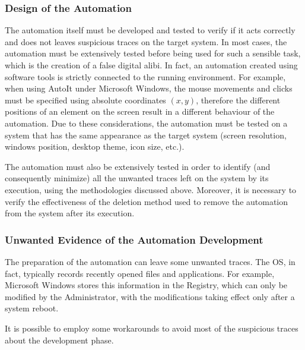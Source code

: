 \documentclass[runningheads]{llncs}
\begin{document}
\subsubsection{Design of the Automation}

The automation itself must be developed and tested to verify if it acts correctly and does not leaves suspicious traces on the target system.
In most cases, the automation must be extensively tested before being used for such a sensible task, which is the creation of a false digital alibi. In fact, an automation created using software tools is strictly connected to the running environment. For example, when using AutoIt under Microsoft Windows, the mouse movements and clicks must be specified using absolute coordinates $(x,y)$, therefore the different positions of an element on the screen result in a different behaviour of the automation. Due to these considerations, the automation must be tested on a system that has the same appearance as the target system (screen resolution, windows position, desktop theme, icon size, etc.).

The automation must also be extensively tested in order to identify (and consequently minimize) all the unwanted traces left on the system by its execution, using the methodologies discussed above. Moreover, it is necessary to verify the effectiveness of the deletion method used to remove the automation from the system after its execution.


\subsubsection{Unwanted Evidence of the Automation Development}

The preparation of the automation can leave some unwanted traces. The OS, in fact, typically records recently opened files and applications. For example, Microsoft Windows stores this information in the Registry, which can only be  modified by the Administrator, with the modifications taking effect only after a system reboot.

It is possible to employ some workarounds to avoid most of the suspicious traces about the development phase.
\end{document}
